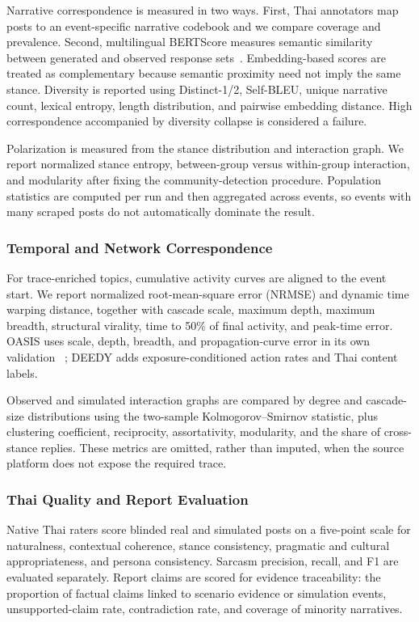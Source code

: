 \documentclass[conference]{IEEEtran}
\begin{document}
Narrative correspondence is measured in two ways. First, Thai annotators map
posts to an event-specific narrative codebook and we compare coverage and
prevalence. Second, multilingual BERTScore measures semantic similarity between
generated and observed response sets~\cite{zhang2020bertscore}. Embedding-based
scores are treated as complementary because semantic proximity need not imply
the same stance. Diversity is reported using Distinct-1/2, Self-BLEU, unique
narrative count, lexical entropy, length distribution, and pairwise embedding
distance. High correspondence accompanied by diversity collapse is considered
a failure.

Polarization is measured from the stance distribution and interaction graph.
We report normalized stance entropy, between-group versus within-group
interaction, and modularity after fixing the community-detection procedure.
Population statistics are computed per run and then aggregated across events,
so events with many scraped posts do not automatically dominate the result.

\subsubsection{Temporal and Network Correspondence}

For trace-enriched topics, cumulative activity curves are aligned to the event
start. We report normalized root-mean-square error (NRMSE) and dynamic time
warping distance, together with cascade scale, maximum depth, maximum breadth,
structural virality, time to 50\% of final activity, and peak-time error. OASIS
uses scale, depth, breadth, and propagation-curve error in its own validation
~\cite{yang2024oasis}; DEEDY adds exposure-conditioned action rates and Thai
content labels.

Observed and simulated interaction graphs are compared by degree and cascade-
size distributions using the two-sample Kolmogorov--Smirnov statistic, plus
clustering coefficient, reciprocity, assortativity, modularity, and the share
of cross-stance replies. These metrics are omitted, rather than imputed, when
the source platform does not expose the required trace.

\subsubsection{Thai Quality and Report Evaluation}

Native Thai raters score blinded real and simulated posts on a five-point scale
for naturalness, contextual coherence, stance consistency, pragmatic and
cultural appropriateness, and persona consistency. Sarcasm precision, recall,
and F1 are evaluated separately. Report claims are scored for evidence
traceability: the proportion of factual claims linked to scenario evidence or
simulation events, unsupported-claim rate, contradiction rate, and coverage of
minority narratives.
\end{document}
